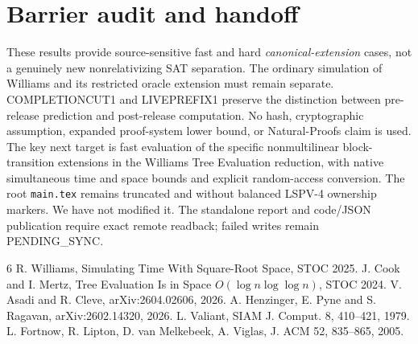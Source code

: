 \documentclass[11pt]{article}
\begin{document}
\section{Barrier audit and handoff}
These results provide source-sensitive fast and hard
\emph{canonical-extension} cases, not a genuinely new
nonrelativizing SAT separation. The ordinary simulation of Williams
and its restricted oracle extension must remain separate.
COMPLETIONCUT1 and LIVEPREFIX1 preserve the distinction between
pre-release prediction and post-release computation. No hash,
cryptographic assumption, expanded proof-system lower bound,
or Natural-Proofs claim is used.
The key next target is fast evaluation of the specific
nonmultilinear block-transition extensions in the Williams
Tree Evaluation reduction, with native simultaneous time and
space bounds and explicit random-access conversion.
The root \texttt{main.tex} remains truncated and without balanced
LSPV-4 ownership markers. We have not modified it. The standalone
report and code/JSON publication require exact remote readback;
failed writes remain PENDING\_SYNC.
\begin{thebibliography}{6}
 R. Williams, Simulating Time With Square-Root Space,
STOC 2025.
 J. Cook and I. Mertz, Tree Evaluation Is in Space
$O(\log n\log\log n)$, STOC 2024.
 V. Asadi and R. Cleve, arXiv:2604.02606, 2026.
 A. Henzinger, E. Pyne and S. Ragavan,
arXiv:2602.14320, 2026.
 L. Valiant, SIAM J. Comput. 8, 410--421, 1979.
 L. Fortnow, R. Lipton, D. van Melkebeek,
A. Viglas, J. ACM 52, 835--865, 2005.
\end{thebibliography}
\end{document}
